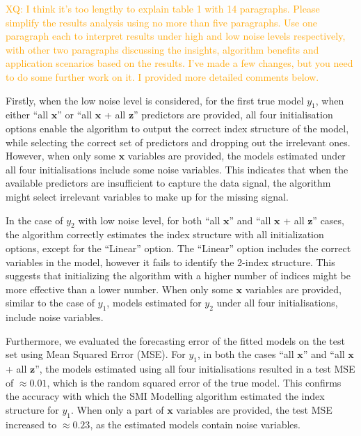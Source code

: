 \documentclass[11pt,a4paper,]{article}
\begin{document}
\textcolor{orange}{XQ: I think it's too lengthy to explain table 1 with 14 paragraphs. Please simplify the results analysis using no more than five paragraphs. Use one paragraph each to interpret results under high and low noise levels respectively, with other two paragraphs discussing the insights, algorithm benefits and application scenarios based on the results. I've made a few changes, but you need to do some further work on it. I provided more detailed comments below.}

Firstly, when the low noise level is considered, for the first true
model \(y_{1}\), when either ``all \(\bm{x}\)'' or ``all \(\bm{x}\) +
all \(\bm{z}\)'' predictors are provided, all four initialisation
options enable the algorithm to output the correct index structure of
the model, while selecting the correct set of predictors and dropping
out the irrelevant ones. However, when only some \(\bm{x}\) variables
are provided, the models estimated under all four initialisations
include some noise variables. This indicates that when the available
predictors are insufficient to capture the data signal, the algorithm
might select irrelevant variables to make up for the missing signal.

In the case of \(y_{2}\) with low noise level, for both ``all
\(\bm{x}\)'' and ``all \(\bm{x}\) + all \(\bm{z}\)'' cases, the
algorithm correctly estimates the index structure with all
initialization options, except for the ``Linear'' option. The ``Linear''
option includes the correct variables in the model, however it fails to
identify the 2-index structure. This suggests that initializing the
algorithm with a higher number of indices might be more effective than a
lower number. When only some \(\bm{x}\) variables are provided, similar
to the case of \(y_{1}\), models estimated for \(y_{2}\) under all four
initialisations, include noise variables.

Furthermore, we evaluated the forecasting error of the fitted models on
the test set using Mean Squared Error (MSE). For \(y_{1}\), in both the
cases ``all \(\bm{x}\)'' and ``all \(\bm{x}\) + all \(\bm{z}\)'', the
models estimated using all four initialisations resulted in a test MSE
of \(\approx 0.01\), which is the random squared error of the true
model. This confirms the accuracy with which the SMI Modelling algorithm
estimated the index structure for \(y_{1}\). When only a part of
\(\bm{x}\) variables are provided, the test MSE increased to
\(\approx 0.23\), as the estimated models contain noise variables.
\end{document}
